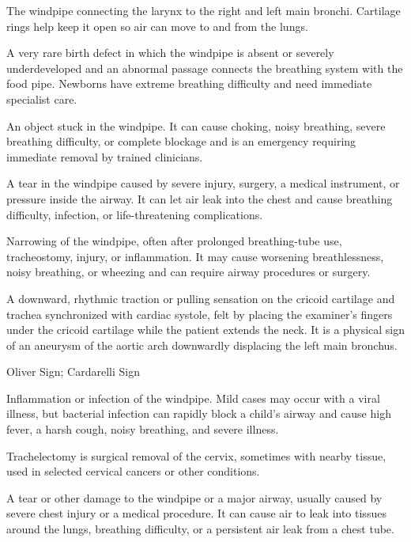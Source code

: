  The windpipe connecting the larynx to the right and left main bronchi. Cartilage rings help keep it open so air can move to and from the lungs.

 A very rare birth defect in which the windpipe is absent or severely underdeveloped and an abnormal passage connects the breathing system with the food pipe. Newborns have extreme breathing difficulty and need immediate specialist care.

 An object stuck in the windpipe. It can cause choking, noisy breathing, severe breathing difficulty, or complete blockage and is an emergency requiring immediate removal by trained clinicians.

 A tear in the windpipe caused by severe injury, surgery, a medical instrument, or pressure inside the airway. It can let air leak into the chest and cause breathing difficulty, infection, or life-threatening complications.

 Narrowing of the windpipe, often after prolonged breathing-tube use, tracheostomy, injury, or inflammation. It may cause worsening breathlessness, noisy breathing, or wheezing and can require airway procedures or surgery.

 A downward, rhythmic traction or pulling sensation on the cricoid cartilage and trachea synchronized with cardiac systole, felt by placing the examiner's fingers under the cricoid cartilage while the patient extends the neck. It is a physical sign of an aneurysm of the aortic arch downwardly displacing the left main bronchus.

\synonyms
Oliver Sign; Cardarelli Sign

 Inflammation or infection of the windpipe. Mild cases may occur with a viral illness, but bacterial infection can rapidly block a child's airway and cause high fever, a harsh cough, noisy breathing, and severe illness.

 Trachelectomy is surgical removal of the cervix, sometimes with nearby tissue, used in selected cervical cancers or other conditions.

 A tear or other damage to the windpipe or a major airway, usually caused by severe chest injury or a medical procedure. It can cause air to leak into tissues around the lungs, breathing difficulty, or a persistent air leak from a chest tube.

